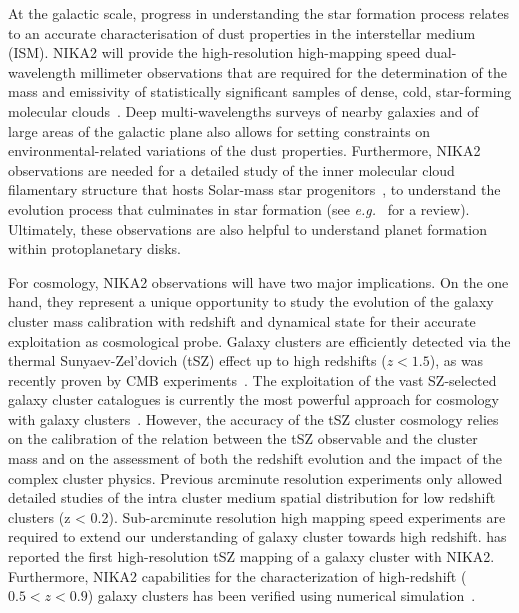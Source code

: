 At the galactic scale, progress in understanding the star formation
process relates to an accurate characterisation of dust properties in
the interstellar medium (ISM). NIKA2 will provide the high-resolution
high-mapping speed dual-wavelength millimeter observations that are
required for the determination of the mass and emissivity of
statistically significant samples of dense, cold, star-forming
molecular clouds~\citep{Rigby2018}.
Deep multi-wavelengths surveys of nearby galaxies and of large areas
of the galactic plane also allows for setting constraints on
environmental-related variations of the dust properties.
Furthermore, NIKA2 observations are needed for a
detailed study of the inner molecular cloud filamentary structure that
hosts Solar-mass star progenitors~\citep{Bracco2017}, to
understand the evolution process that culminates in star
formation (see \emph{e.g.}~\citet{Andre2014} for a review). Ultimately, these
observations are also helpful to understand planet formation within
protoplanetary disks.

For cosmology, NIKA2 observations will have two major
implications. On the one hand, they represent a unique opportunity to
study the evolution of the galaxy cluster mass calibration with
redshift and {\lp dynamical state} for their accurate exploitation as cosmological probe. 
Galaxy clusters are efficiently detected via the thermal
Sunyaev-Zel'dovich (tSZ) effect up to high redshifts {\lp ($z<1.5$)}, as was recently
proven by CMB
experiments~\citep{Hasselfield2013_ACT_SZ, Reichardt2013_SPT_SZ, Planck2016_SZcat}.
The exploitation of the vast SZ-selected galaxy cluster catalogues is
currently the most powerful approach for cosmology with galaxy
clusters~\citep{Planck_2016_SZ_cosmo}. However, the accuracy of the tSZ cluster
cosmology relies on the calibration of the relation between the tSZ
observable and the cluster mass and on the assessment of both the redshift
evolution and the impact of the complex cluster physics. 
Previous arcminute resolution experiments only allowed detailed studies
of the intra cluster medium spatial distribution for low redshift clusters (z <
0.2). Sub-arcminute resolution high mapping speed experiments are
required to extend our understanding of galaxy cluster towards high
redshift. \citet{Ruppin2018} has reported the first high-resolution
tSZ mapping of a galaxy cluster with NIKA2. Furthermore, NIKA2
capabilities for the characterization of high-redshift {\lp ($0.5<z<0.9$)} galaxy clusters
has been verified using numerical simulation~\citep{Ruppin2019}.

